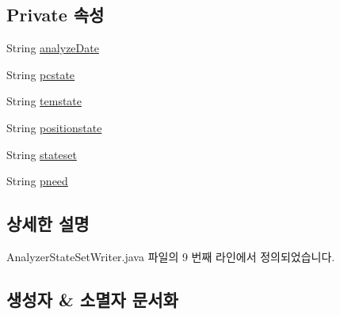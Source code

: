 \subsection*{Private 속성}
\begin{DoxyCompactItemize}
\item 
String \mbox{\hyperlink{classcom_1_1github_1_1aites_1_1shlocalaites_1_1gkconnect_1_1_analyzer_state_set_writer_a775ad5006162ef24ef79a40a30b0b886}{analyze\+Date}}
\item 
String \mbox{\hyperlink{classcom_1_1github_1_1aites_1_1shlocalaites_1_1gkconnect_1_1_analyzer_state_set_writer_ad0d775a45f2ff015d7494105de6968b9}{pcstate}}
\item 
String \mbox{\hyperlink{classcom_1_1github_1_1aites_1_1shlocalaites_1_1gkconnect_1_1_analyzer_state_set_writer_a15e54040bff7dcf8339e68642e3b4b8b}{temstate}}
\item 
String \mbox{\hyperlink{classcom_1_1github_1_1aites_1_1shlocalaites_1_1gkconnect_1_1_analyzer_state_set_writer_aee7af9c2d37cd631c5ee9e36d9028d11}{positionstate}}
\item 
String \mbox{\hyperlink{classcom_1_1github_1_1aites_1_1shlocalaites_1_1gkconnect_1_1_analyzer_state_set_writer_aba9c1043254afe9abe7dfdb8467b03be}{stateset}}
\item 
String \mbox{\hyperlink{classcom_1_1github_1_1aites_1_1shlocalaites_1_1gkconnect_1_1_analyzer_state_set_writer_a517da42ac98dcb3578c57ea11f54f8dd}{pneed}}
\end{DoxyCompactItemize}


\subsection{상세한 설명}


Analyzer\+State\+Set\+Writer.\+java 파일의 9 번째 라인에서 정의되었습니다.



\subsection{생성자 \& 소멸자 문서화}
\mbox{\label{classcom_1_1github_1_1aites_1_1shlocalaites_1_1gkconnect_1_1_analyzer_state_set_writer_a11068e793e6994d0860def19c92ad3a1}} 
